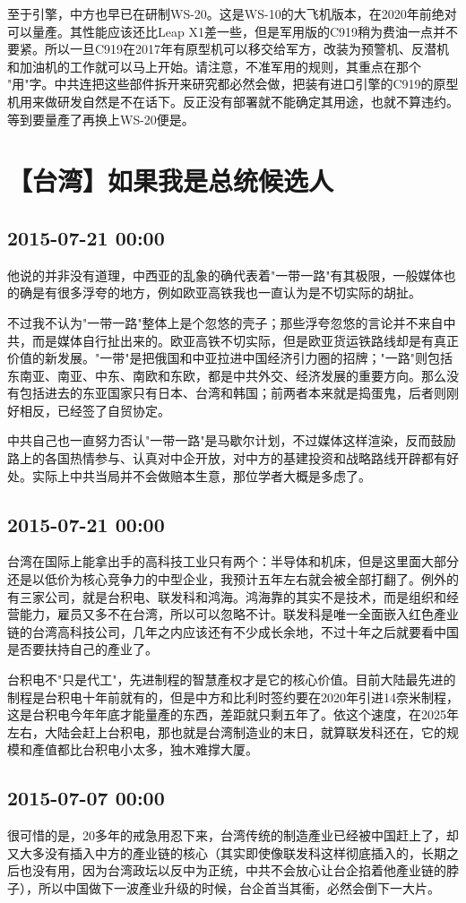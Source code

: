 \documentclass[twocolumn]{ctexart}
\begin{document}
至于引擎，中方也早已在研制WS-20。这是WS-10的大飞机版本，在2020年前绝对可以量產。其性能应该还比Leap X1差一些，但是军用版的C919稍为费油一点并不要紧。所以一旦C919在2017年有原型机可以移交给军方，改装为预警机、反潜机和加油机的工作就可以马上开始。请注意，不准军用的规则，其重点在那个 "用"字。中共连把这些部件拆开来研究都必然会做，把装有进口引擎的C919的原型机用来做研发自然是不在话下。反正没有部署就不能确定其用途，也就不算违约。等到要量產了再换上WS-20便是。\section*{【台湾】如果我是总统候选人}
\subsection*{2015-07-21 00:00}
他说的并非没有道理，中西亚的乱象的确代表着"一带一路"有其极限，一般媒体也的确是有很多浮夸的地方，例如欧亚高铁我也一直认为是不切实际的胡扯。

不过我不认为"一带一路"整体上是个忽悠的壳子；那些浮夸忽悠的言论并不来自中共，而是媒体自行扯出来的。欧亚高铁不切实际，但是欧亚货运铁路线却是有真正价值的新发展。"一带"是把俄国和中亚拉进中国经济引力圈的招牌；"一路"则包括东南亚、南亚、中东、南欧和东欧，都是中共外交、经济发展的重要方向。那么没有包括进去的东亚国家只有日本、台湾和韩国；前两者本来就是捣蛋鬼，后者则刚好相反，已经签了自贸协定。

中共自己也一直努力否认"一带一路"是马歇尔计划，不过媒体这样渲染，反而鼓励路上的各国热情参与、认真对中企开放，对中方的基建投资和战略路线开辟都有好处。实际上中共当局并不会做赔本生意，那位学者大概是多虑了。\subsection*{2015-07-21 00:00}
台湾在国际上能拿出手的高科技工业只有两个：半导体和机床，但是这里面大部分还是以低价为核心竞争力的中型企业，我预计五年左右就会被全部打翻了。例外的有三家公司，就是台积电、联发科和鸿海。鸿海靠的其实不是技术，而是组织和经营能力，雇员又多不在台湾，所以可以忽略不计。联发科是唯一全面嵌入红色產业链的台湾高科技公司，几年之内应该还有不少成长余地，不过十年之后就要看中国是否要扶持自己的產业了。

台积电不"只是代工"，先进制程的智慧產权才是它的核心价值。目前大陆最先进的制程是台积电十年前就有的，但是中方和比利时签约要在2020年引进14奈米制程，这是台积电今年年底才能量產的东西，差距就只剩五年了。依这个速度，在2025年左右，大陆会赶上台积电，那也就是台湾制造业的末日，就算联发科还在，它的规模和產值都比台积电小太多，独木难撑大厦。\subsection*{2015-07-07 00:00}
很可惜的是，20多年的戒急用忍下来，台湾传统的制造產业已经被中国赶上了，却又大多没有插入中方的產业链的核心（其实即使像联发科这样彻底插入的，长期之后也没有用，因为台湾政坛以反中为正统，中共不会放心让台企掐着他產业链的脖子），所以中国做下一波產业升级的时候，台企首当其衝，必然会倒下一大片。
\end{document}
